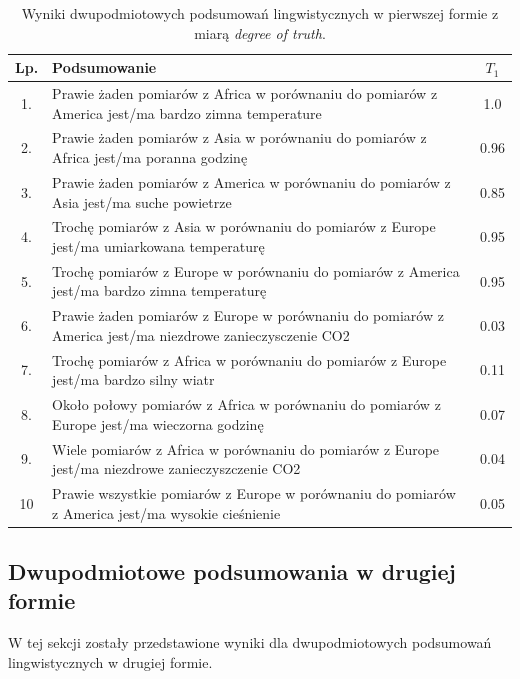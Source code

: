 \documentclass{article}
\begin{document}
\begin{table}[H]
\begin{center}
\normalsize %
\begin{tabular}{|c|p{10cm}|c|} %
\hline
\textbf{Lp.} & \textbf{Podsumowanie} & \textbf{\(T_1\)} \\ \hline
1. & Prawie żaden pomiarów z Africa w porównaniu do pomiarów z America jest/ma bardzo zimna temperature & 1.0 \\\hline
2. & Prawie żaden pomiarów z Asia w porównaniu do pomiarów z Africa jest/ma poranna godzinę & 0.96 \\\hline
3. & Prawie żaden pomiarów z America w porównaniu do pomiarów z Asia jest/ma suche powietrze & 0.85 \\\hline
4. & Trochę pomiarów z Asia w porównaniu do pomiarów z Europe jest/ma umiarkowana temperaturę & 0.95 \\\hline
5. & Trochę pomiarów z Europe w porównaniu do pomiarów z America jest/ma bardzo zimna temperaturę & 0.95 \\\hline
6. & Prawie żaden pomiarów z Europe w porównaniu do pomiarów z America jest/ma niezdrowe zanieczysczenie CO2  & 0.03 
\\\hline
7. & Trochę pomiarów z Africa w porównaniu do pomiarów z Europe jest/ma bardzo silny wiatr & 0.11 \\ \hline
8. & Około połowy pomiarów z Africa w porównaniu do pomiarów z Europe jest/ma wieczorna godzinę & 0.07 \\ \hline
9. & Wiele pomiarów z Africa w porównaniu do pomiarów z Europe jest/ma niezdrowe zanieczyszczenie CO2 & 0.04 \\ \hline 
10 & Prawie wszystkie pomiarów z Europe w porównaniu do pomiarów z America jest/ma wysokie cieśnienie & 0.05 \\ \hline
\end{tabular}
\caption{Wyniki dwupodmiotowych podsumowań lingwistycznych w pierwszej formie z miarą \textit{degree of truth}.}
\end{center}
\end{table}

\subsection{Dwupodmiotowe podsumowania w drugiej formie}
W tej sekcji zostały przedstawione wyniki dla dwupodmiotowych podsumowań lingwistycznych w drugiej formie.
\end{document}
